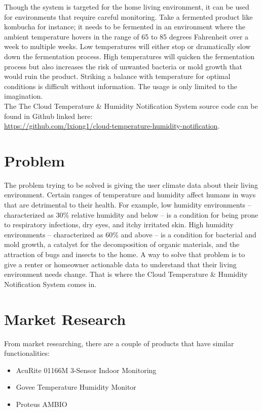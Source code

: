 \documentclass{article}
\begin{document}
Though the system is targeted for the home living environment, it can be used for environments that require careful monitoring. Take a fermented product like kombucha for instance; it needs to be fermented in an environment where the ambient temperature hovers in the range of 65 to 85 degrees Fahrenheit over a week to multiple weeks. Low temperatures will either stop or dramatically slow down the fermentation process. High temperatures will quicken the fermentation process but also increases the risk of unwanted bacteria or mold growth that would ruin the product. Striking a balance with temperature for optimal conditions is difficult without information. The usage is only limited to the imagination.\\

The The Cloud Temperature \& Humidity Notification System source code can be found in Github linked here: \\\url{https://github.com/lxiong1/cloud-temperature-humidity-notification}.

\section{Problem}
The problem trying to be solved is giving the user climate data about their living environment. Certain ranges of temperature and humidity affect humans in ways that are detrimental to their health. For example, low humidity environments --characterized as 30\% relative humidity and below -- is a condition for being prone to respiratory infections, dry eyes, and itchy irritated skin. High humidity environments -- characterized as 60\% and above -- is a condition for bacterial and mold growth, a catalyst for the decomposition of organic materials, and the attraction of bugs and insects to the home. A way to solve that problem is to give a renter or homeowner actionable data to understand that their living environment needs change. That is where the Cloud Temperature \& Humidity Notification System comes in.

\section{Market Research}
From market researching, there are a couple of products that have similar functionalities:

\begin{itemize}
	\item AcuRite 01166M 3-Sensor Indoor Monitoring
	\item Govee Temperature Humidity Monitor
	\item Proteus AMBIO
\end{itemize}
\end{document}
